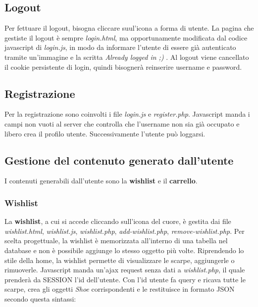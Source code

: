 \documentclass[a4paper,12pt]{article}
\begin{document}
\subsection{Logout}
Per fettuare il logout, bisogna cliccare suul'icona a forma di utente.
La pagina che gestiste il logout è sempre \textit{login.html}, ma opportunamente modificata dal codice javascript
di \textit{login.js}, in modo da informare l'utente di essere già autenticato tramite un'immagine e la scritta
\textit{Already logged in ;) }. Al logout viene cancellato il cookie persistente di login, quindi bisognerà
reinserire username e password.
\subsection{Registrazione}
Per la registrazione sono coinvolti i file \textit{login.js} e \textit{register.php}.
Javascript manda i campi non vuoti al server che controlla che l'username non sia già
occupato e libero crea il profilo utente. Successivamente l'utente può loggarsi.

\subsection{Gestione del contenuto generato dall'utente}
I contenuti generabili dall'utente sono la \textbf{wishlist} e il \textbf{carrello}.
\subsubsection{Wishlist}
La \textbf{wishlist}, a cui si accede cliccando sull'icona del cuore, è gestita dai file
\textit{wishlist.html}, \textit{wishlist.js}, \textit{wishlist.php}, \textit{add-wishlist.php},
\textit{remove-wishlist.php}. Per scelta progettuale, la wishlist è memorizzata all'interno di una tabella nel database
e non è possibile aggiunge lo stesso oggetto più volte.
Riprendendo lo stile della home, la wishlist permette di visualizzare le scarpe, aggiungerle o rimuoverle.
Javascript manda un'ajax request senza dati  a \textit{wishlist.php},
il quale prenderà da \textdollar\textunderscore SESSION l'id dell'utente.
Con l'id utente fa query e ricava tutte le scarpe, crea gli oggetti
\textit{Shoe} corrispondenti e le restituisce in formato JSON secondo questa sintassi:
\end{document}
